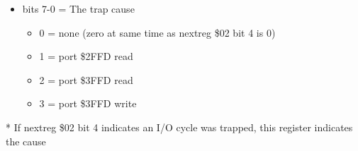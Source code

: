 \begin{itemize}
\item bits 7-0 = The trap cause
\begin{itemize}
\item[] 0 = none (zero at same time as nextreg \$02 bit 4 is 0)
\item[] 1 = port \$2FFD read
\item[] 2 = port \$3FFD read
\item[] 3 = port \$3FFD write
\end{itemize}
\end{itemize}
* If nextreg \$02 bit 4 indicates an I/O cycle was trapped, this
  register indicates the cause

